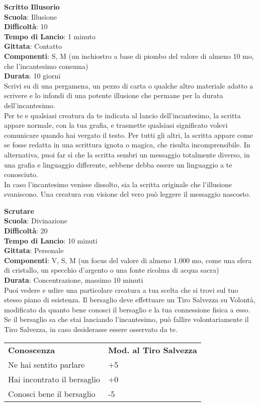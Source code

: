 \begin{multicols}{2}
\medskip\textbf{Scritto Illusorio}\\
\textbf{Scuola}: Illusione\\
\textbf{Difficoltà}:  10\\
\textbf{Tempo di Lancio}: 1 minuto\\
\textbf{Gittata}: Contatto\\
\textbf{Componenti}: S, M (un inchiostro a base di piombo del valore di almeno 10 mo, che l'incantesimo consuma)\\
\textbf{Durata}: 10 giorni\\
Scrivi su di una pergamena, un pezzo di carta o qualche altro materiale adatto a scrivere e lo infondi di una potente illusione che permane per la durata dell'incantesimo.\\
Per te e qualsiasi creatura da te indicata al lancio dell'incantesimo, la scritta appare normale, con la tua grafia, e trasmette qualsiasi significato volevi comunicare quando hai vergato il testo. Per tutti gli altri, la scritta appare come se fosse redatta in una scrittura ignota o magica, che risulta incomprensibile. In alternativa, puoi far sì che la scritta sembri un messaggio totalmente diverso, in una grafia e linguaggio differente, sebbene debba essere un linguaggio a te conosciuto.\\
In caso l'incantesimo venisse dissolto, sia la scritta originale che l’illusione svaniscono. Una creatura con visione del vero può leggere il messaggio nascosto.

\medskip\textbf{Scrutare}\\
\textbf{Scuola}: Divinazione\\
\textbf{Difficoltà}:  20\\
\textbf{Tempo di Lancio}: 10 minuti\\
\textbf{Gittata}: Personale\\
\textbf{Componenti}: V, S, M (un focus del valore di almeno 1.000 mo, come una sfera di cristallo, un specchio d’argento o una fonte ricolma di acqua sacra)\\
\textbf{Durata}: Concentrazione, massimo 10 minuti\\
Puoi vedere e udire una particolare creatura a tua scelta che si trovi sul tuo stesso piano di esistenza. Il bersaglio deve effettuare un Tiro Salvezza su Volontà, modificato da quanto bene conosci il bersaglio e la tua connessione fisica a esso. Se il bersaglio sa che stai lanciando l'incantesimo, può fallire volontariamente il Tiro Salvezza, in caso desiderasse essere osservato da
te.
\medskip
\begin{tabular}{ll}
\toprule
\textbf{Conoscenza} & \textbf{Mod. al Tiro Salvezza}\\
Ne hai sentito parlare &+5\\
Hai incontrato il bersaglio &+0\\
Conosci bene il bersaglio &-5\\
\end{tabular}


\end{multicols}
